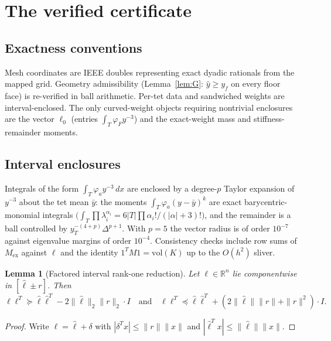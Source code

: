 \documentclass[11pt]{amsart}
\newtheorem{lemma}[theorem]{Lemma}
\newcommand{\RR}{\mathbb{R}}
\newcommand{\vol}{\mathrm{vol}}
\begin{document}
\section{The verified certificate}\label{sec:cert}

\subsection{Exactness conventions}

Mesh coordinates are IEEE doubles representing exact dyadic rationals
from the mapped grid.  Geometry admissibility (Lemma~\ref{lem:G}:
$\hat y\ge y_f$ on every floor face) is re-verified in ball arithmetic.
Per-tet data and sandwiched weights are interval-enclosed.  The only
curved-weight objects requiring nontrivial enclosures are the vector
$\ell_0$ (entries $\int_T\varphi_F y^{-3}$) and the exact-weight mass and
stiffness-remainder moments.

\subsection{Interval enclosures}

Integrals of the form $\int_T\varphi_a y^{-3}\,dx$ are enclosed by a
degree-$p$ Taylor expansion of $y^{-3}$ about the tet mean $\bar y$: the
moments $\int_T\varphi_a(y-\bar y)^k$ are exact barycentric-monomial
integrals
$\bigl(\int_T\prod\lambda_i^{\alpha_i}=6|T|\prod\alpha_i!/(|\alpha|+3)!\bigr)$,
and the remainder is a ball controlled by
$y_T^{-(4+p)}\Delta^{p+1}$.  With $p=5$ the vector radius is of order
$10^{-7}$ against eigenvalue margins of order $10^{-4}$.  Consistency
checks include row sums of $M_{\mathrm{ex}}$ against $\ell$ and the
identity $1^TM1=\vol(K)$ up to the $O(h^2)$ sliver.

\begin{lemma}[Factored interval rank-one reduction]\label{lem:R}
Let $\ell\in\RR^n$ lie componentwise in $[\hat\ell\pm r]$.  Then
\[
  \ell\ell^T\succeq\hat\ell\hat\ell^T-2\|\hat\ell\|_2\|r\|_2\cdot I
  \quad\text{and}\quad
  \ell\ell^T\preceq\hat\ell\hat\ell^T+(2\|\hat\ell\|\|r\|+\|r\|^2)\cdot I.
\]
\end{lemma}

\begin{proof}
Write $\ell=\hat\ell+\delta$ with $|\delta^Tx|\le\|r\|\|x\|$ and
$|\hat\ell^Tx|\le\|\hat\ell\|\|x\|$.
\end{proof}
\end{document}
